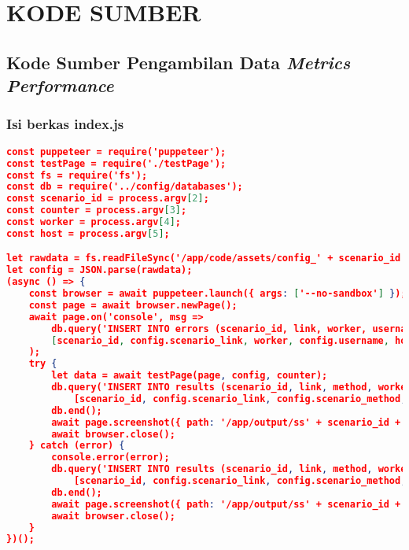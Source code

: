 \chapter{KODE SUMBER}

\section*{Kode Sumber Pengambilan Data \textit{Metrics Performance}} \label{puppeteer}
	\subsection*{Isi berkas index.js}
\begin{lstlisting}[frame=single,tabsize=2,breaklines,caption={Isi berkas index.js},label=indexjs, captionpos=b, language=json]
const puppeteer = require('puppeteer');
const testPage = require('./testPage');
const fs = require('fs');
const db = require('../config/databases');
const scenario_id = process.argv[2];
const counter = process.argv[3];
const worker = process.argv[4];
const host = process.argv[5];

let rawdata = fs.readFileSync('/app/code/assets/config_' + scenario_id + '.json');
let config = JSON.parse(rawdata);
(async () => {
	const browser = await puppeteer.launch({ args: ['--no-sandbox'] });
	const page = await browser.newPage();
	await page.on('console', msg =>
		db.query('INSERT INTO errors (scenario_id, link, worker, username, host, type, text, location_url) VALUES (?, ?, ?, ?, ?, ?, ?, ?)',
		[scenario_id, config.scenario_link, worker, config.username, host, msg._type, msg._text, msg._location.url])
	);
	try {
		let data = await testPage(page, config, counter);
		db.query('INSERT INTO results (scenario_id, link, method, worker, username, host, response_end, dom_content_load, load_event_end, css_trace_end, first_meaningful) VALUES (?, ?, ?, ?, ?, ?, ?, ?, ?, ?, ?)',
			[scenario_id, config.scenario_link, config.scenario_method, worker, config.username, host, data.Timing.responseEnd, data.Timing.domContentLoadedEventEnd, data.Timing.loadEventEnd, data.TraceResult.cssEnd, data.Metrics.FirstMeaningfulPaint]);
		db.end();
		await page.screenshot({ path: '/app/output/ss' + scenario_id + '.png' });
		await browser.close();
	} catch (error) {
		console.error(error);
		db.query('INSERT INTO results (scenario_id, link, method, worker, username, host, response_end, dom_content_load, load_event_end, css_trace_end, first_meaningful) VALUES (?, ?, ?, ?, ?, ?, ?, ?, ?, ?, ?)',
			[scenario_id, config.scenario_link, config.scenario_method, worker, config.username, host, -1, -1, -1, -1, -1]);
		db.end();
		await page.screenshot({ path: '/app/output/ss' + scenario_id + '.png' });
		await browser.close();
	}
})();
\end{lstlisting}

